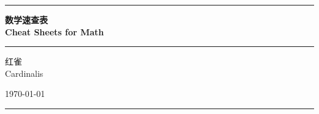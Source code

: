 \begin{titlepage}
	\centering
	\rule{\textwidth}{1pt}

	\vspace{0.15\textheight}

	{\Huge \bfseries 数学速查表\\\vspace{1ex}Cheat Sheets for Math}

	\vspace{0.025\textheight}

	\rule{0.8\textwidth}{0.4pt}

	\vspace{0.1\textheight}

	{\Large 红雀\\\vspace{1ex}Cardinalis}

	\vfill

	{\large \today}

	\vspace{0.1\textheight}

	\rule{\textwidth}{1pt}
\end{titlepage}